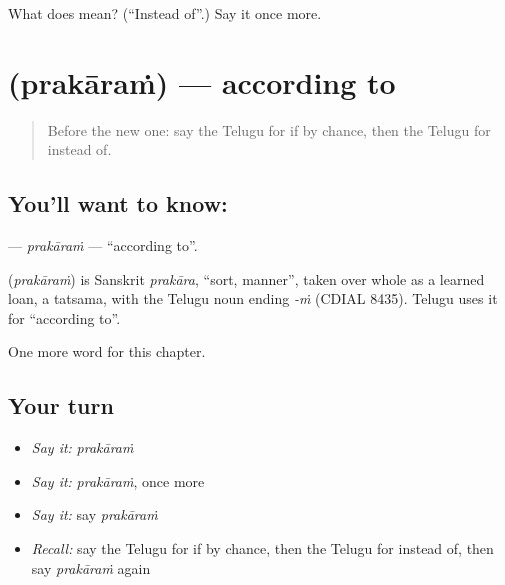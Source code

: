 \begin{tcolorbox}[breakable,colback=teal!4,colframe=teal!35!black,title={Before you move on}]
What does  mean? (\textquotedblleft{}Instead of\textquotedblright{}.) Say it once more.
\end{tcolorbox}
\section[\texorpdfstring{\te{ప్రకారం} (prakāraṁ)}{ప్రకారం (prakāraṁ)}]{ (prakāraṁ) — according to}

\label{lesson:TE-C177-prakaram}



\begin{quote}
Before the new one: say the Telugu for if by chance, then the Telugu for instead of.
\end{quote}

\subsection*{You'll want to know: }
\textbf{} — \emph{prakāraṁ} — \textquotedblleft{}according to\textquotedblright{}.

\begin{cousinweb}
\textbf{} (\emph{prakāraṁ}) is Sanskrit \emph{prakāra}, \textquotedblleft{}sort, manner\textquotedblright{}, taken over whole as a learned loan, a tatsama, with the Telugu noun ending \emph{-ṁ} (CDIAL 8435). Telugu uses it for \textquotedblleft{}according to\textquotedblright{}.
\end{cousinweb}

\begin{grammarlens}[title={What you've built}]
One more word for this chapter.
\end{grammarlens}

\subsection*{Your turn}
\begin{itemize}
\raggedright
  \item \emph{Say it:} \emph{prakāraṁ}
  \item \emph{Say it:} \emph{prakāraṁ}, once more
  \item \emph{Say it:} say \emph{prakāraṁ}
  \item \emph{Recall:} say the Telugu for if by chance, then the Telugu for instead of, then say \emph{prakāraṁ} again
\end{itemize}

